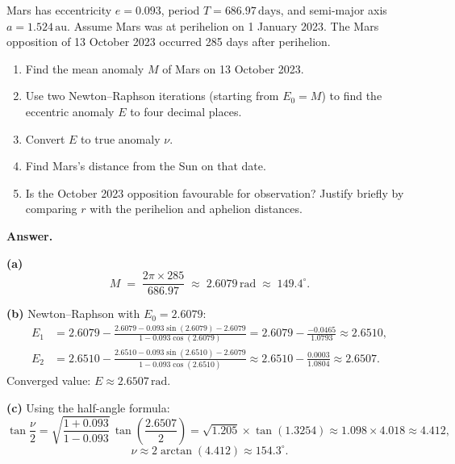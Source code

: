 \documentclass[12pt]{article}
\newenvironment{probbox}[2]{%
  \begin{tcolorbox}[
    enhanced, breakable,
    colback=blue!5!white, colframe=deepblue,
    boxrule=0.8pt, arc=4pt,
    title={\bfseries [#1] Problem #2}
  ]
}{\end{tcolorbox}}
\begin{document}
\vspace{0.6cm}

\begin{probbox}{10 points}{2. Mars at Opposition}
Mars has eccentricity $e = 0.093$, period $T = 686.97\,\text{days}$, and
semi-major axis $a = 1.524\,\text{au}$. Assume Mars was at perihelion on
1 January 2023. The Mars opposition of 13 October 2023 occurred 285 days after
perihelion.
\begin{enumerate}
  \item[(a)] Find the mean anomaly $M$ of Mars on 13 October 2023.
  \item[(b)] Use two Newton--Raphson iterations (starting from $E_0 = M$) to find
             the eccentric anomaly $E$ to four decimal places.
  \item[(c)] Convert $E$ to true anomaly $\nu$.
  \item[(d)] Find Mars's distance from the Sun on that date.
  \item[(e)] Is the October 2023 opposition favourable for observation? Justify
             briefly by comparing $r$ with the perihelion and aphelion distances.
\end{enumerate}

\medskip
\textbf{\color{blue!60!black}Answer.}

\textbf{(a)}
\begin{equation*}
  M \;=\; \frac{2\pi \times 285}{686.97} \;\approx\; 2.6079\,\text{rad}
        \;\approx\; 149.4^\circ.
\end{equation*}

\textbf{(b)} Newton--Raphson with $E_0 = 2.6079$:
\begin{align*}
  E_1 &= 2.6079 - \frac{2.6079 - 0.093\sin(2.6079) - 2.6079}{1 - 0.093\cos(2.6079)}
       = 2.6079 - \frac{-0.0465}{1.0793} \approx 2.6510,\\[4pt]
  E_2 &= 2.6510 - \frac{2.6510 - 0.093\sin(2.6510) - 2.6079}{1 - 0.093\cos(2.6510)}
       \approx 2.6510 - \frac{0.0003}{1.0804} \approx 2.6507.
\end{align*}
Converged value: $E \approx 2.6507\,\text{rad}$.

\textbf{(c)} Using the half-angle formula:
\begin{equation*}
  \tan\frac{\nu}{2}
    = \sqrt{\frac{1+0.093}{1-0.093}}\,\tan\!\left(\frac{2.6507}{2}\right)
    = \sqrt{1.205}\times\tan(1.3254)
    \approx 1.098\times 4.018
    \approx 4.412,
\end{equation*}
\begin{equation*}
  \nu \approx 2\arctan(4.412) \approx 154.3^\circ.
\end{equation*}


\end{probbox}
\end{document}
